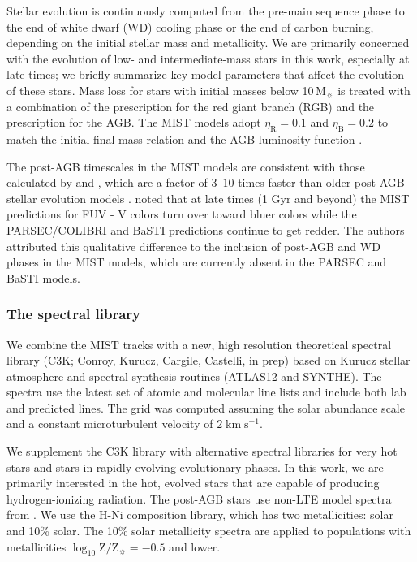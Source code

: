 \documentclass[preprint2]{aastex62}
\newcommand\Msun{\ensuremath{\,\mathrm{M_{\sun}}}\xspace}
\newcommand{\logten}{\ensuremath{\log_{10}}}
\newcommand{\logZeq}[1]{\ensuremath{\logten \mathrm{Z}/\mathrm{Z}_{\sun} = #1}}
\newcommand{\kms}{\ensuremath{\;\mathrm{km}\;\mathrm{s}^{-1}}\xspace}
\begin{document}
Stellar evolution is continuously computed from the pre-main sequence phase to the end of white dwarf (WD) cooling phase or the end of carbon burning, depending on the initial stellar mass and metallicity. We are primarily concerned with the evolution of low- and intermediate-mass stars in this work, especially at late times; we briefly summarize key model parameters that affect the evolution of these stars. Mass loss for stars with initial masses below 10\Msun is treated with a combination of the \citet{Reimers+1975} prescription for the red giant branch (RGB) and the \citet{Bloecker+1995} prescription for the AGB. The MIST models adopt $\eta_{\mathrm{R}} = 0.1$ and $\eta_{\mathrm{B}} = 0.2$ to match the initial-final mass relation \citep{Kalirai+2009} and the AGB luminosity function \citep{Rosenfield+2014}.

The post-AGB timescales in the MIST models are consistent with those calculated by \citet{Miller+2016} and \citet{Weiss+2009}, which are a factor of $3–10$ times faster than older post-AGB stellar evolution models \citep{Vassiliadis+1994, Bloecker+1995}. \citet{Choi+2016} noted that at late times (1 Gyr and beyond) the MIST predictions for FUV - V colors turn over toward bluer colors while the PARSEC/COLIBRI \citep{Bressan+2012, Marigo+2013, Rosenfield+2014} and BaSTI \citep{Pietrinferni+2004} predictions continue to get redder. The authors attributed this qualitative difference to the inclusion of post-AGB and WD phases in the MIST models, which are currently absent in the PARSEC and BaSTI models.

\subsubsection{The spectral library}
We combine the MIST tracks with a new, high resolution theoretical spectral library (C3K; Conroy, Kurucz, Cargile, Castelli, in prep) based on Kurucz stellar atmosphere and spectral synthesis routines (ATLAS12 and SYNTHE). The spectra use the latest set of atomic and molecular line lists and include both lab and predicted lines. The grid was computed assuming the \citet{Asplund+2009} solar abundance scale and a constant microturbulent velocity of 2\kms.

We supplement the C3K library with alternative spectral libraries for very hot stars and stars in rapidly evolving evolutionary phases. In this work, we are primarily interested in the hot, evolved stars that are capable of producing hydrogen-ionizing radiation. The post-AGB stars use non-LTE model spectra from \citet{Rauch+2003}. We use the H-Ni composition library, which has two metallicities: solar and 10\% solar. The 10\% solar metallicity spectra are applied to populations with metallicities \logZeq{-0.5} and lower. 
\end{document}
